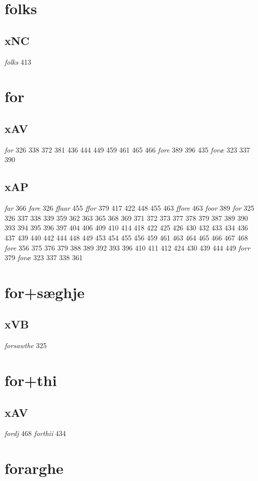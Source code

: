 \documentclass[a4paper,twocolumn]{article}
\begin{document}
\section{folks}
\label{sec:org0fc095d}
\subsection{xNC}
\label{sec:org77680b3}
\emph{folks} 413 
\section{for}
\label{sec:org0915d1a}
\subsection{xAV}
\label{sec:org7be56b3}
\emph{for} 326 338 372 381 436 444 449 459 461 465 466 \emph{fore} 389 396 435 \emph{foræ} 323 337 390 
\subsection{xAP}
\label{sec:orgf43564f}
\emph{far} 366 \emph{fare} 326 \emph{ffaar} 455 \emph{ffor} 379 417 422 448 455 463 \emph{ffore} 463 \emph{foor} 389 \emph{for} 325 326 337 338 339 359 362 363 365 368 369 371 372 373 377 378 379 387 389 390 393 394 395 396 397 404 406 409 410 414 418 422 425 426 430 432 433 434 436 437 439 440 442 444 448 449 453 454 455 456 459 461 463 464 465 466 467 468 \emph{fore} 356 375 376 379 388 389 392 393 396 410 411 412 424 430 439 444 449 \emph{forr} 379 \emph{foræ} 323 337 338 361 
\section{for+sæghje}
\label{sec:orga55c765}
\subsection{xVB}
\label{sec:org3a51140}
\emph{forsawthe} 325 
\section{for+thi}
\label{sec:org08d5790}
\subsection{xAV}
\label{sec:orge19d2a0}
\emph{fordj} 468 \emph{forthii} 434 
\section{forarghe}
\label{sec:org11f4e5d}
\end{document}
